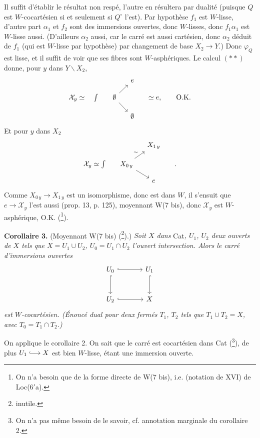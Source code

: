 \documentclass[11pt]{article}
\newcommand{\msp}[1]{\marginpar{\footnotesize [#1]}}
\begin{document}
Il suffit d'établir le résultat non respé, l'autre en résultera par dualité (puisque $Q$ est $W$-cocartésien si et seulement si $Q^\circ$ l'est). Par hypothèse $f_1$ est $W$-lisse, d'autre part $\alpha_1$ et $f_2$ sont des immersions ouvertes, donc $W$-lisses, donc $f_1\alpha_1$ est $W$-lisse aussi. (D'ailleurs $\alpha_2$ aussi, car le carré est aussi cartésien, donc $\alpha_2$ déduit de $f_1$ (qui est $W$-lisse par hypothèse) par changement de base $X_2 \longrightarrow Y$.) Donc $\varphi_Q$ est lisse, et il suffit de voir que ses fibres sont $W$-asphériques. Le calcul $(**)$ donne, pour $y$ dans $Y\backslash X_2$,
\[
\begin{tikzcd}[row sep=small, column sep=small]
 & & e & \\
\mathcal{X}_y \simeq \quad \int &[-1.2em] \emptyset \arrow[ur] \arrow[dr] & &[1em] \simeq e, \qquad \text{O.K.} \\
 & & \emptyset &
\end{tikzcd}
\]
Et pour $y$ dans $X_2$
\[
\begin{tikzcd}[row sep=small, column sep=small]
 & & X_{1\,y} & \\
\mathcal{X}_y \simeq \int &[-1.2em] X_{0\,y} \arrow[ur,"\sim"] \arrow[dr] & &[2em] . \\
 & & e &
\end{tikzcd}
\]
\msp{page 149}Comme $X_{0\,y} \longrightarrow X_{1\,y}$ est un isomorphisme, donc est dans $W$, il s'ensuit que $e \longrightarrow \mathcal{X}_y$ l'est aussi (prop. 13, p. 125), moyennant W(7 bis), donc $\mathcal{X}_y$ est $W$-asphérique, O.K. (\footnote{On n'a besoin que de la forme directe de W(7 bis), i.e. (notation de XVI) de Loc(6$'$a).}).

\textbf{Corollaire 3.} (Moyennant W(7 bis) (\footnote{inutile.}).) \textit{Soit $X$ dans} Cat\textit{, $U_1$, $U_2$ deux ouverts de $X$ tels que $X = U_1 \cup U_2$, $U_0 = U_1 \cap U_2$ l'ouvert intersection. Alors le carré d'immersions ouvertes}
\[
\begin{tikzcd}[row sep=large, column sep=large]
U_0 \arrow[r,hook] \arrow[d,hook] & U_1 \arrow[d,hook] \\
U_2 \arrow[r,hook] & X
\end{tikzcd}
\]
\textit{est $W$-cocartésien. (Énoncé dual pour deux fermés $T_1$, $T_2$ tels que $T_1 \cup T_2 = X$, avec $T_0 = T_1 \cap T_2$.)}

On applique le corollaire 2. On sait que le carré est cocartésien dans Cat (\footnote{On n'a pas même besoin de le savoir, cf. annotation marginale du corollaire 2.}), de plus $U_1 \lhook\joinrel\longrightarrow X$ est bien $W$-lisse, étant une immersion ouverte.
\end{document}

